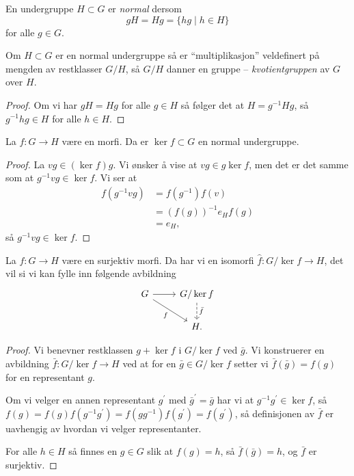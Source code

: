 \begin{definition}
    En undergruppe $H\subset G$ er \textit{normal}
    dersom
    \[
        gH = Hg = \{hg\mid h\in H\}
    \]
    for alle $g\in G$.
\end{definition}

\begin{lemma}
    Om $H\subset G$ er en normal undergruppe så er ``multiplikasjon''
    veldefinert på mengden av restklasser $G / H$,
    så $G / H$ danner en gruppe -- \textit{kvotientgruppen} av $G$ over $H$.
\end{lemma}
\begin{proof}
    Om vi har $gH = Hg$ for alle $g\in H$ så følger det at
    $H = g^{-1} H g$,
    så $g^{-1}h g\in H$ for alle $h\in H$.
\end{proof}

\begin{lemma}
    La $f\colon G\to H$ være en morfi.
    Da er $\ker f\subset G$ en normal undergruppe.
\end{lemma}
\begin{proof}
    La $vg\in(\ker f) g$.
    Vi ønsker å vise at $vg\in g\ker f$,
    men det er det samme som at $g^{-1} vg\in \ker f$.
    Vi ser at
    \[\begin{aligned}
        f(g^{-1}vg)
        &= f(g^{-1})f(v)
        \\
        &= {(f(g))}^{-1} e_H f(g)
        \\
        &= e_H,
    \end{aligned}\]
    så $g^{-1} vg\in \ker f$.
\end{proof}

\begin{theorem}
    La $f\colon G\to H$ være en surjektiv morfi.
    Da har vi en isomorfi $\hat f\colon G / \ker f \to H$,
    det vil si vi kan fylle inn følgende avbildning
    \[\begin{tikzcd}
        G
        \rar
        \drar[swap]{f}
        &
        G / \ker f
        \dar[dashed]{\bar f}
        \\
        &
        H.
    \end{tikzcd}\]
\end{theorem}
\begin{proof}
    Vi benevner restklassen $g + \ker f$ i $G / \ker f$
    ved $\bar g$.
    Vi konstruerer en avbildning $\bar f\colon G / \ker f\to H$
    ved at for en $\bar g\in G / \ker f$ setter vi
    $\bar f(\bar g) = f(g)$ for en representant $g$.

    Om vi velger en annen representant $g^\prime$ med
    $\bar g^\prime = \bar g$ har vi at $g^{-1}g^\prime\in\ker f$,
    så $f(g) = f(g)f(g^{-1}g^\prime) = f(gg^{-1})f(g^\prime) = f(g^\prime)$,
    så definisjonen av $\bar f$ er uavhengig av hvordan vi velger representanter.

    For alle $h\in H$ så finnes en $g\in G$ slik at $f(g) = h$,
    så $\bar f(\bar g) = h$, og $\bar f$ er surjektiv.

\end{proof}

